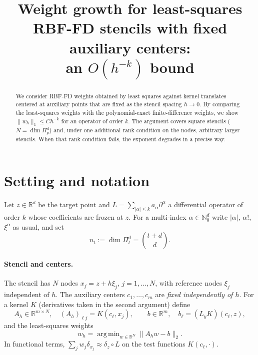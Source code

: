 \documentclass[11pt]{article}
\title{Weight growth for least-squares RBF-FD stencils with fixed auxiliary centers:\\ an $O(h^{-k})$ bound}
\author{}
\date{}
\newcommand{\R}{\mathbb{R}}
\newcommand{\N}{\mathbb{N}}
\newcommand{\Pol}[2]{\Pi_{#1}^{#2}}
\newcommand{\norm}[1]{\lVert #1\rVert}
\DeclareMathOperator*{\argmin}{arg\,min}
\theoremstyle{plain}
\theoremstyle{definition}
\theoremstyle{remark}
\begin{document}
\maketitle

\begin{abstract}
We consider RBF-FD weights obtained by least squares against kernel translates centered at auxiliary points that are fixed as the stencil spacing $h\to0$.
By comparing the least-squares weights with the polynomial-exact finite-difference weights, we show $\norm{w_h}_1\le C h^{-k}$ for an operator of order $k$.
The argument covers square stencils ($N=\dim\Pi_p^d$) and, under one additional rank condition on the nodes, arbitrary larger stencils.
When that rank condition fails, the exponent degrades in a precise way.
\end{abstract}

\section{Setting and notation}

Let $z\in\R^d$ be the target point and
$L=\sum_{|\alpha|\le k}a_\alpha\partial^\alpha$ a differential operator of order $k$ whose coefficients are frozen at $z$.
For a multi-index $\alpha\in\N_0^d$ write $|\alpha|$, $\alpha!$, $\xi^\alpha$ as usual, and set
\[
n_t:=\dim\Pol{t}{d}=\binom{t+d}{d}.
\]

\paragraph{Stencil and centers.}
The stencil has $N$ nodes $x_j=z+h\xi_j$, $j=1,\dots,N$, with reference nodes $\xi_j$ independent of $h$.
The auxiliary centers $c_1,\dots,c_m$ are \emph{fixed independently of $h$}.
For a kernel $K$ (derivatives taken in the second argument) define
\[
A_h\in\R^{m\times N},\quad (A_h)_{\ell j}=K(c_\ell,x_j),
\qquad
b\in\R^m,\quad b_\ell=(L_yK)(c_\ell,z),
\]
and the least-squares weights
\[
w_h=\argmin_{w\in\R^N}\norm{A_hw-b}_2 .
\]
In functional terms, $\sum_j w_j\delta_{x_j}\approx\delta_z\circ L$ on the test functions $K(c_\ell,\cdot)$.
\end{document}

